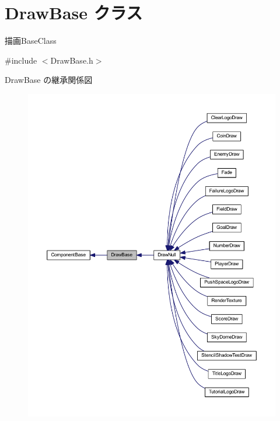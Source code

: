 \hypertarget{class_draw_base}{}\section{Draw\+Base クラス}
\label{class_draw_base}


描画\+Base\+Class  




{\ttfamily \#include $<$Draw\+Base.\+h$>$}



Draw\+Base の継承関係図\nopagebreak
\begin{figure}[H]
\begin{center}
\leavevmode
\includegraphics[width=350pt]{class_draw_base__inherit__graph}
\end{center}
\end{figure}
